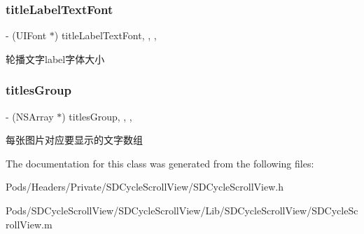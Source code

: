 \subsubsection{\texorpdfstring{title\+Label\+Text\+Font}{titleLabelTextFont}}
{\footnotesize\ttfamily -\/ (U\+I\+Font $\ast$) title\+Label\+Text\+Font\hspace{0.3cm}{\ttfamily [read]}, {\ttfamily [write]}, {\ttfamily [nonatomic]}, {\ttfamily [strong]}}

轮播文字label字体大小 \mbox{\label{interface_s_d_cycle_scroll_view_a823f7f01321b7bed8e297e7a47b0f228}} 
\subsubsection{\texorpdfstring{titles\+Group}{titlesGroup}}
{\footnotesize\ttfamily -\/ (N\+S\+Array $\ast$) titles\+Group\hspace{0.3cm}{\ttfamily [read]}, {\ttfamily [write]}, {\ttfamily [nonatomic]}, {\ttfamily [strong]}}

每张图片对应要显示的文字数组 

The documentation for this class was generated from the following files\+:\begin{DoxyCompactItemize}
\item 
Pods/\+Headers/\+Private/\+S\+D\+Cycle\+Scroll\+View/S\+D\+Cycle\+Scroll\+View.\+h\item 
Pods/\+S\+D\+Cycle\+Scroll\+View/\+S\+D\+Cycle\+Scroll\+View/\+Lib/\+S\+D\+Cycle\+Scroll\+View/S\+D\+Cycle\+Scroll\+View.\+m\end{DoxyCompactItemize}
